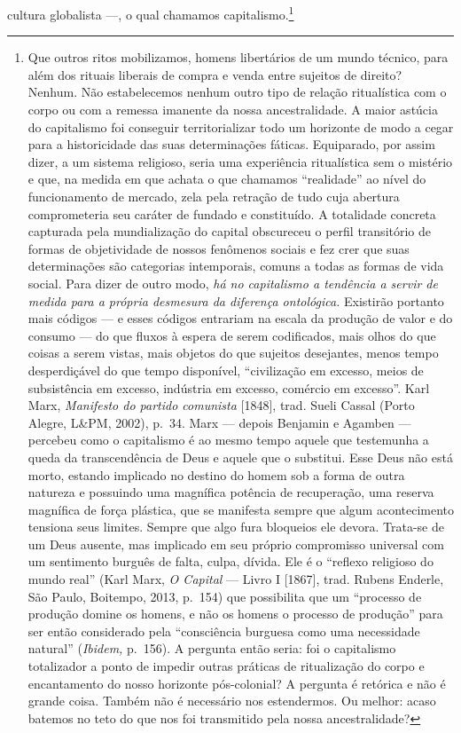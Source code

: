 cultura globalista ---, o qual chamamos capitalismo.\footnote{Que outros
  ritos mobilizamos, homens libertários de um mundo técnico, para além
  dos rituais liberais de compra e venda entre sujeitos de direito?
  Nenhum. Não estabelecemos nenhum outro tipo de relação ritualística
  com o corpo ou com a remessa imanente da nossa ancestralidade. A maior
  astúcia do capitalismo foi conseguir territorializar todo um horizonte
  de modo a cegar para a historicidade das suas determinações fáticas.
  Equiparado, por assim dizer, a um sistema religioso, seria uma
  experiência ritualística sem o mistério e que, na medida em que achata
  o que chamamos ``realidade'' ao nível do funcionamento de mercado,
  zela pela retração de tudo cuja abertura comprometeria seu caráter de
  fundado e constituído. A totalidade concreta capturada pela
  mundialização do capital obscureceu o perfil transitório de formas de
  objetividade de nossos fenômenos sociais e fez crer que suas
  determinações são categorias intemporais, comuns a todas as formas de
  vida social. Para dizer de outro modo, \textit{há no capitalismo a
  tendência a servir de medida para a própria desmesura da diferença
  ontológica.} Existirão portanto mais códigos --- e esses códigos
  entrariam na escala da produção de valor e do consumo --- do que fluxos
  à espera de serem codificados, mais olhos do que coisas a serem
  vistas, mais objetos do que sujeitos desejantes, menos tempo
  desperdiçável do que tempo disponível, ``civilização em excesso, meios
  de subsistência em excesso, indústria em excesso, comércio em
  excesso''. Karl Marx, \textit{Manifesto do partido comunista}
  {[}1848{]}, trad. Sueli Cassal (Porto Alegre, L\&PM, 2002), p.~34.
  Marx --- depois Benjamin e Agamben --- percebeu como o capitalismo é ao
  mesmo tempo aquele que testemunha a queda da transcendência de Deus e
  aquele que o substitui. Esse Deus não está morto, estando implicado no
  destino do homem sob a forma de outra natureza e possuindo uma
  magnífica potência de recuperação, uma reserva magnífica de força
  plástica, que se manifesta sempre que algum acontecimento tensiona
  seus limites. Sempre que algo fura bloqueios ele devora. Trata-se de
  um Deus ausente, mas implicado em seu próprio compromisso universal
  com um sentimento burguês de falta, culpa, dívida. Ele é o ``reflexo
  religioso do mundo real'' (Karl Marx, \textit{O Capital} --- Livro I
  {[}1867{]}, trad. Rubens Enderle, São Paulo, Boitempo, 2013, p.~154)
  que possibilita que um ``processo de produção domine os homens, e não
  os homens o processo de produção'' para ser então considerado pela
  ``consciência burguesa como uma necessidade natural'' (\textit{Ibidem,}
  p.~156). A pergunta então seria: foi o capitalismo totalizador a ponto
  de impedir outras práticas de ritualização do corpo e encantamento do
  nosso horizonte pós-colonial? A pergunta é retórica e não é grande
  coisa. Também não é necessário nos estendermos. Ou melhor: acaso
  batemos no teto do que nos foi transmitido pela nossa ancestralidade?}

